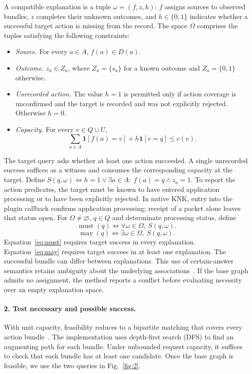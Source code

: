 A compatible explanation is a tuple $\omega=(f,z,h)$: $f$ assigns sources to observed bundles, $z$ completes their unknown outcomes, and $h\in\{0,1\}$ indicates whether a successful target action is missing from the record. The space $\Omega$ comprises the tuples satisfying the following constraints:
\begin{itemize}
\item \emph{Source.} For every $a\in A$, $f(a)\in D(a)$.
\item \emph{Outcome.} $z_a\in Z_a$, where $Z_a=\{s_a\}$ for a known outcome and $Z_a=\{0,1\}$ otherwise.
\item \emph{Unrecorded action.} The value $h=1$ is permitted only if action coverage is unconfirmed and the target is recorded and was not explicitly rejected. Otherwise $h=0$.
\item \emph{Capacity.} For every $v\in Q\cup U$,
\[
   \sum_{a\in A}\mathbf{1}[f(a)=v]+h\mathbf{1}[v=q]\le c(v).
\]
\end{itemize}

The target query asks whether at least one action succeeded. A single unrecorded success suffices as a witness and consumes the corresponding capacity at the target. Define $S(q,\omega)\iff h=1\lor\exists a\in A:\ f(a)=q\land z_a=1$. To report the action predicates, the target must be known to have entered application processing or to have been explicitly rejected. In native KNK, entry into the plugin callback confirms application processing; receipt of a packet alone leaves that status open. For $\Omega\ne\varnothing$, $q\in Q$ and determinate processing status, define
\begin{equation}
  \operatorname{must}(q)\iff\forall\omega\in\Omega,\ S(q,\omega).
  \label{eq:must}
\end{equation}
\begin{equation}
  \operatorname{may}(q)\iff\exists\omega\in\Omega,\ S(q,\omega).
  \label{eq:may}
\end{equation}
Equation~\eqref{eq:must} requires target success in every explanation. Equation~\eqref{eq:may} requires target success in at least one explanation. The successful bundle can differ between explanations. This use of certain-answer semantics retains ambiguity about the underlying associations~\citep{r38}. If the base graph admits no assignment, the method reports a conflict before evaluating necessity over an empty explanation space.

\paragraph{2. Test necessary and possible success.}
With unit capacity, feasibility reduces to a bipartite matching that covers every action bundle~\citep{r40}. The implementation uses depth-first search (DFS) to find an augmenting path for each bundle. Under unbounded request capacity, it suffices to check that each bundle has at least one candidate. Once the base graph is feasible, we use the two queries in Fig.~\ref{fig:2}.

